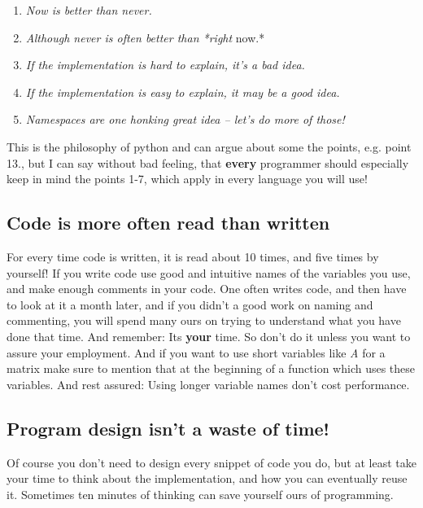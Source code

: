 \documentclass[letterpaper,10pt,english]{manual}
\begin{document}
\begin{enumerate}
\item {} 
\emph{Now is better than never.}

\item {} 
\emph{Although never is often better than *right} now.*

\item {} 
\emph{If the implementation is hard to explain, it's a bad idea.}

\item {} 
\emph{If the implementation is easy to explain, it may be a good idea.}

\item {} 
\emph{Namespaces are one honking great idea -- let's do more of those!}

\end{enumerate}

This is the philosophy of python and can argue about some the points,
e.g. point 13., but I can say without bad feeling, that \textbf{every}
programmer should especially keep in mind the points 1-7, which apply in every
language you will use!


\subsection{Code is more often read than written}

For every time code is written, it is read about 10 times, and
five times by yourself! If you write code use good and intuitive
names of the variables you use, and make enough comments in your code.
One often writes code, and then have to look at it a month later, and if
you didn't a good work on naming and commenting, you will spend many ours
on trying to understand what you have done that time. And remember: Its \textbf{your} time.
So don't do it unless you want to assure your employment.
And if you want to use short variables like \emph{A} for a matrix make sure to mention
that at the beginning of a function which uses these variables.
And rest assured: Using longer variable names don't cost performance.


\subsection{Program design isn't a waste of time!}

Of course you don't need to design every snippet of code you do,
but at least take your time to think about the implementation, and
how you can eventually reuse it. Sometimes ten minutes of thinking
can save yourself ours of programming.
\hypertarget{oo-ref}{}
\end{document}
